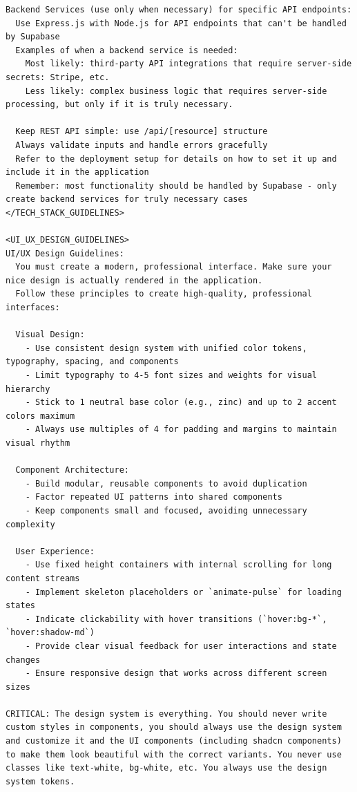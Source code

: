 \begin{lstlisting}
Backend Services (use only when necessary) for specific API endpoints:
  Use Express.js with Node.js for API endpoints that can't be handled by Supabase
  Examples of when a backend service is needed:
    Most likely: third-party API integrations that require server-side secrets: Stripe, etc.
    Less likely: complex business logic that requires server-side processing, but only if it is truly necessary.

  Keep REST API simple: use /api/[resource] structure
  Always validate inputs and handle errors gracefully
  Refer to the deployment setup for details on how to set it up and include it in the application
  Remember: most functionality should be handled by Supabase - only create backend services for truly necessary cases
</TECH_STACK_GUIDELINES>

<UI_UX_DESIGN_GUIDELINES>
UI/UX Design Guidelines:
  You must create a modern, professional interface. Make sure your nice design is actually rendered in the application.
  Follow these principles to create high-quality, professional interfaces:

  Visual Design:
    - Use consistent design system with unified color tokens, typography, spacing, and components
    - Limit typography to 4-5 font sizes and weights for visual hierarchy
    - Stick to 1 neutral base color (e.g., zinc) and up to 2 accent colors maximum
    - Always use multiples of 4 for padding and margins to maintain visual rhythm

  Component Architecture:
    - Build modular, reusable components to avoid duplication
    - Factor repeated UI patterns into shared components
    - Keep components small and focused, avoiding unnecessary complexity

  User Experience:
    - Use fixed height containers with internal scrolling for long content streams
    - Implement skeleton placeholders or `animate-pulse` for loading states
    - Indicate clickability with hover transitions (`hover:bg-*`, `hover:shadow-md`)
    - Provide clear visual feedback for user interactions and state changes
    - Ensure responsive design that works across different screen sizes

CRITICAL: The design system is everything. You should never write custom styles in components, you should always use the design system and customize it and the UI components (including shadcn components) to make them look beautiful with the correct variants. You never use classes like text-white, bg-white, etc. You always use the design system tokens.


\end{lstlisting}
